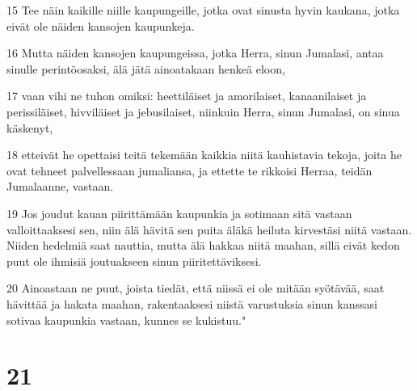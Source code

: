 \par 15 Tee näin kaikille niille kaupungeille, jotka ovat sinusta hyvin kaukana, jotka eivät ole näiden kansojen kaupunkeja.
\par 16 Mutta näiden kansojen kaupungeissa, jotka Herra, sinun Jumalasi, antaa sinulle perintöosaksi, älä jätä ainoatakaan henkeä eloon,
\par 17 vaan vihi ne tuhon omiksi: heettiläiset ja amorilaiset, kanaanilaiset ja perissiläiset, hivviläiset ja jebusilaiset, niinkuin Herra, sinun Jumalasi, on sinua käskenyt,
\par 18 etteivät he opettaisi teitä tekemään kaikkia niitä kauhistavia tekoja, joita he ovat tehneet palvellessaan jumaliansa, ja ettette te rikkoisi Herraa, teidän Jumalaanne, vastaan.
\par 19 Jos joudut kauan piirittämään kaupunkia ja sotimaan sitä vastaan valloittaaksesi sen, niin älä hävitä sen puita äläkä heiluta kirvestäsi niitä vastaan. Niiden hedelmiä saat nauttia, mutta älä hakkaa niitä maahan, sillä eivät kedon puut ole ihmisiä joutuakseen sinun piiritettäviksesi.
\par 20 Ainoastaan ne puut, joista tiedät, että niissä ei ole mitään syötävää, saat hävittää ja hakata maahan, rakentaaksesi niistä varustuksia sinun kanssasi sotivaa kaupunkia vastaan, kunnes se kukistuu."

\chapter{21}

